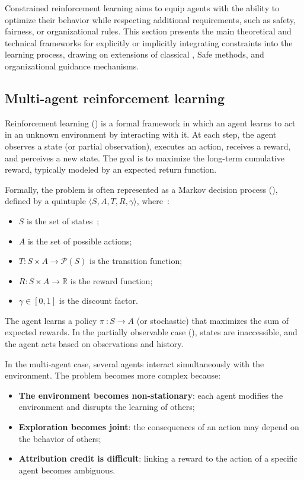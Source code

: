 Constrained reinforcement learning aims to equip agents with the ability to optimize their behavior while respecting additional requirements, such as safety, fairness, or organizational rules. This section presents the main theoretical and technical frameworks for explicitly or implicitly integrating constraints into the learning process, drawing on extensions of classical , Safe  methods, and organizational guidance mechanisms.

\subsection {Multi-agent reinforcement learning}

Reinforcement learning () is a formal framework in which an agent learns to act in an unknown environment by interacting with it. At each step, the agent observes a state (or partial observation), executes an action, receives a reward, and perceives a new state. The goal is to maximize the long-term cumulative reward, typically modeled by an expected return function.

Formally, the problem is often represented as a Markov decision process (), defined by a quintuple $\langle S, A, T, R, \gamma \rangle$, where~:
\begin{itemize}
  \item $S$ is the set of states~;
  \item $A$ is the set of possible actions;
  \item $T: S \times A \rightarrow \mathcal{P}(S)$ is the transition function;
  \item $R: S \times A \rightarrow \mathbb{R}$ is the reward function;
  \item $\gamma \in [0,1]$ is the discount factor.
        \end {itemize}

        The agent learns a policy $\pi~: S \rightarrow A$ (or stochastic) that maximizes the sum of expected rewards. In the partially observable case (), states are inaccessible, and the agent acts based on observations and history.


        In the multi-agent case, several agents interact simultaneously with the environment. The problem becomes more complex because:
        \begin{itemize}
          \item \textbf{The environment becomes non-stationary}: each agent modifies the environment and disrupts the learning of others;
          \item \textbf{Exploration becomes joint}: the consequences of an action may depend on the behavior of others;
          \item \textbf{Attribution credit is difficult}: linking a reward to the action of a specific agent becomes ambiguous.
        \end{itemize}

